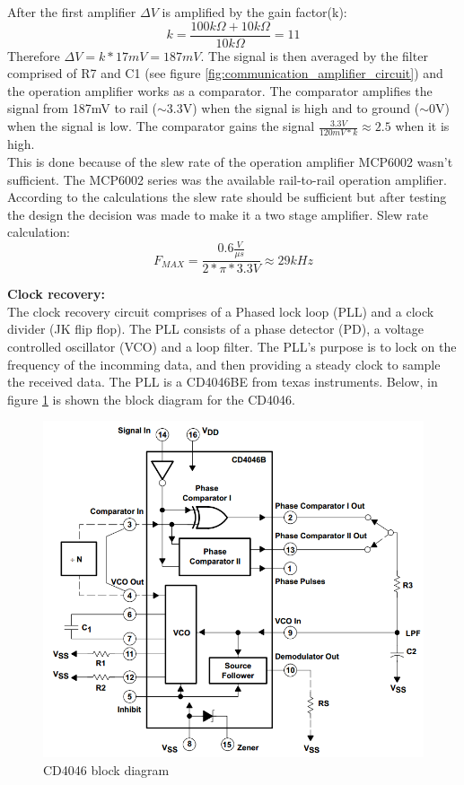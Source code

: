 After the first amplifier $\Delta V$ is amplified by the gain factor(k):
\begin{equation}
	k=\frac{100k\Omega+10k\Omega}{10k\Omega}=11
\end{equation}
Therefore $\Delta V=k*17mV=187mV$. The signal is then averaged by the filter comprised of R7 and C1 (see figure \ref{fig:communication_amplifier_circuit}) and the operation amplifier works as a comparator. The comparator amplifies the signal from 187mV to rail ($\sim$3.3V) when the signal is high and to ground ($\sim$0V) when the signal is low. The comparator gains the signal $\frac{3.3V}{120mV*k}\approx 2.5$ when it is high.\\
This is done because of the slew rate of the operation amplifier MCP6002 wasn't sufficient. The MCP6002 series was the available rail-to-rail operation amplifier.\\
According to the calculations the slew rate should be sufficient but after testing the design the decision was made to make it a two stage amplifier.
Slew rate calculation:
\begin{equation}
	F_{MAX}=\frac{0.6\frac{V}{\mu s}}{2*\pi*3.3V}\approx29kHz
\end{equation}

\textbf{Clock recovery:}\\
The clock recovery circuit comprises of a Phased lock loop (PLL) and a clock divider (JK flip flop). The PLL consists of a phase detector (PD), a voltage controlled oscillator (VCO) and a loop filter. The PLL's purpose is to lock on the frequency of the incomming data, and then providing a steady clock to sample the received data. The PLL is a CD4046BE from texas instruments. Below, in figure \ref{fig:cd4046} is shown the block diagram for the CD4046.

\begin{figure}[H]
	\centering
	\includegraphics[width=.6\textwidth]{billeder/CD4046}
	\caption{CD4046 block diagram}
	\label{fig:cd4046}
\end{figure}

